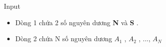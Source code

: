 Input
\begin{itemize}
	\item Dòng 1 chứa 2 số nguyên dương \textbf{ N } và \textbf{ S } .
	\item Dòng 2 chứa N số nguyên dương \textbf{ $A_{1}$} , \textbf{ $A_{2}$} , ..., \textbf{ $A_{N}$}
\end{itemize}